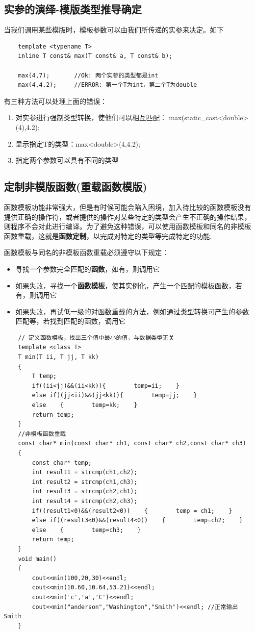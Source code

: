 \documentclass[UTF8,a4paper,12pt]{ctexbook}
\begin{document}
	\subsection{实参的演绎-模版类型推导确定}
				
				当我们调用某些模版时，模板参数可以由我们所传递的实参来决定。如下
			\begin{lstlisting}
	template <typename T>
	inline T const& max(T const& a, T const& b);
			
	max(4,7);		//Ok: 两个实参的类型都是int
	max(4,4.2);		//ERROR: 第一个T为int，第二个T为double
			\end{lstlisting}
			
			有三种方法可以处理上面的错误：
			\begin{enumerate}[itemindent = 1em]
				\item 对实参进行强制类型转换，使他们可以相互匹配： max(static\_cast<double>(4),4.2);
				\item 显示指定T的类型：max<double>(4,4.2); 
				\item 指定两个参数可以具有不同的类型
			\end{enumerate}
			
	\subsection{定制非模版函数(重载函数模版)}
			函数模板功能非常强大，但是有时候可能会陷入困境，加入待比较的函数模板没有提供正确的操作符，或者提供的操作对某些特定的类型会产生不正确的操作结果，则程序不会对此进行编译。为了避免这种错误，可以使用函数模板和同名的非模板函数重载，这就是\textbf{函数定制}，以完成对特定的类型等完成特定的功能.
			
			函数模板与同名的非模板函数重载必须遵守以下规定：
			\begin{itemize}[itemindent = 1em]
				\item 寻找一个参数完全匹配的\textbf{函数}，如有，则调用它
				\item 如果失败，寻找一个\textbf{函数模板}，使其实例化，产生一个匹配的模板函数，若有，则调用它
				\item 如果失败，再试低一级的对函数重载的方法，例如通过类型转换可产生的参数匹配等，若找到匹配的函数，调用它
			\end{itemize}
		\begin{lstlisting}
	// 定义函数模板，找出三个值中最小的值，与数据类型无关 
	template <class T> 
	T min(T ii, T jj, T kk) 
	{ 
		T temp; 
		if((ii<jj)&&(ii<kk)){        temp=ii;    } 
		else if((jj<ii)&&(jj<kk)){        temp=jj;    } 
		else    {        temp=kk;    } 
		return temp; 
	} 
	//非模板函数重载 
	const char* min(const char* ch1, const char* ch2,const char* ch3) 
	{ 
		const char* temp; 
		int result1 = strcmp(ch1,ch2); 
		int result2 = strcmp(ch1,ch3); 
		int result3 = strcmp(ch2,ch1); 
		int result4 = strcmp(ch2,ch3); 
		if((result1<0)&&(result2<0))    {        temp = ch1;    } 
		else if((result3<0)&&(result4<0))    {        temp=ch2;    } 
		else    {        temp=ch3;    } 
		return temp; 
	} 
	void main() 
	{ 
		cout<<min(100,20,30)<<endl; 
		cout<<min(10.60,10.64,53.21)<<endl; 
		cout<<min('c','a','C')<<endl;     
		cout<<min("anderson","Washington","Smith")<<endl; //正常输出 Smith
	} 	
		\end{lstlisting}
\end{document}
